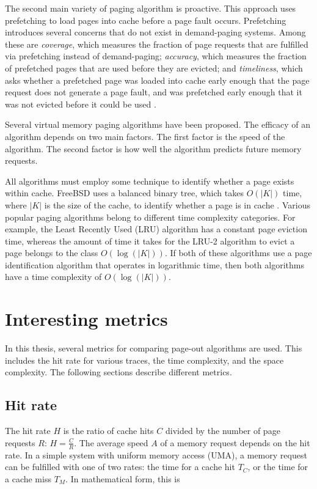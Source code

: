   The second main variety of paging algorithm is proactive. This approach uses
  prefetching to load pages into cache before a page fault occurs. Prefetching
  introduces several concerns that do not exist in demand-paging systems. Among
  these are \emph{coverage}, which measures the fraction of page requests that
  are fulfilled via prefetching instead of demand-paging; \emph{accuracy}, which
  measures the fraction of prefetched pages that are used before they are
  evicted; and \emph{timeliness}, which asks whether a prefetched page was
  loaded into cache early enough that the page request does not generate a
  page fault, and was prefetched early enough that it was not evicted before it
  could be used \cite{joseph1997prefetching}.

  Several virtual memory paging algorithms have been proposed. The efficacy
  of an algorithm depends on two main factors. The first factor is the speed of
  the algorithm. The second factor is how well the algorithm predicts future
  memory requests.

  All algorithms must employ some technique to identify whether a page exists
  within cache. FreeBSD uses a balanced binary tree, which takes $O(|K|)$ time,
  where $|K|$ is the size of the cache, to identify whether a page is in cache
  \cite{mckusick2004design}. Various popular paging algorithms belong to
  different time complexity categories. For example, the Least Recently Used
  (LRU) algorithm has a constant page eviction time, whereas the amount of time
  it takes for the LRU-2 algorithm to evict a page belongs to the class
  $O(\log(|K|))$. If both of these algorithms use a page identification algorithm
  that operates in logarithmic time, then both algorithms have a time
  complexity of $O(\log(|K|))$.

\section{Interesting metrics}
  In this thesis, several metrics for comparing page-out algorithms are used.
  This includes the hit rate for various traces, the time complexity, and the
  space complexity. The following sections describe different metrics.

\subsection{Hit rate}
  The hit rate $H$ is the ratio of cache hits $C$ divided by the number of page
  requests $R$: $H = \frac{C}{R}$. The average speed $A$ of a memory request
  depends on the hit rate. In a simple system with uniform memory access (UMA),
  a memory request can be fulfilled with one of two rates: the time for a cache
  hit $T_C$, or the time for a cache miss $T_M$. In mathematical form, this is

